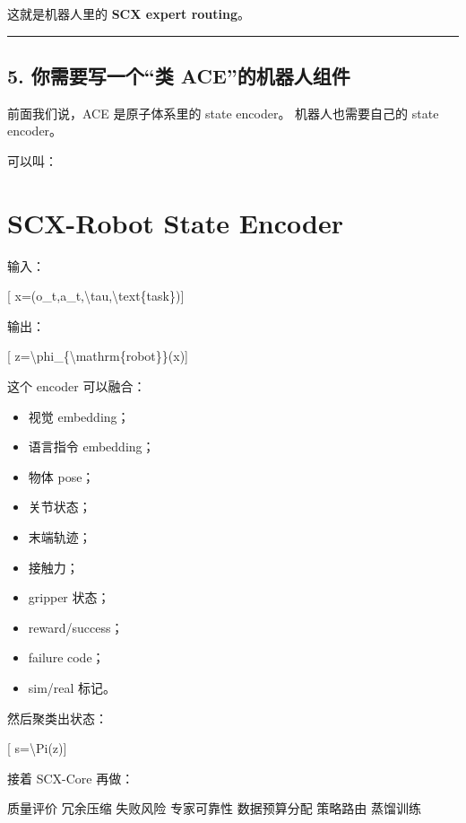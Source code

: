 \documentclass[
  12pt,
]{ctexart}
\newenvironment{Shaded}{}{}
\newcommand{\NormalTok}[1]{#1}
\providecommand{\tightlist}{%
  \setlength{\itemsep}{0pt}\setlength{\parskip}{0pt}}
\begin{document}
这就是机器人里的 \textbf{SCX expert routing}。

\begin{center}\rule{0.5\linewidth}{0.5pt}\end{center}

\subsection{5. 你需要写一个``类
ACE''的机器人组件}\label{ux4f60ux9700ux8981ux5199ux4e00ux4e2aux7c7b-aceux7684ux673aux5668ux4ebaux7ec4ux4ef6}

前面我们说，ACE 是原子体系里的 state encoder。 机器人也需要自己的 state
encoder。

可以叫：

\section{\texorpdfstring{\textbf{SCX-Robot State
Encoder}}{SCX-Robot State Encoder}}\label{scx-robot-state-encoder}

输入：

{[} x=(o\_t,a\_t,\textbackslash tau,\textbackslash text\{task\}){]}

输出：

{[} z=\textbackslash phi\_\{\textbackslash mathrm\{robot\}\}(x){]}

这个 encoder 可以融合：

\begin{itemize}
\tightlist
\item
  视觉 embedding；
\item
  语言指令 embedding；
\item
  物体 pose；
\item
  关节状态；
\item
  末端轨迹；
\item
  接触力；
\item
  gripper 状态；
\item
  reward/success；
\item
  failure code；
\item
  sim/real 标记。
\end{itemize}

然后聚类出状态：

{[} s=\textbackslash Pi(z){]}

接着 SCX-Core 再做：

\begin{Shaded}
\begin{Highlighting}[]
\NormalTok{质量评价}
\NormalTok{冗余压缩}
\NormalTok{失败风险}
\NormalTok{专家可靠性}
\NormalTok{数据预算分配}
\NormalTok{策略路由}
\NormalTok{蒸馏训练}
\end{Highlighting}
\end{Shaded}
\end{document}
